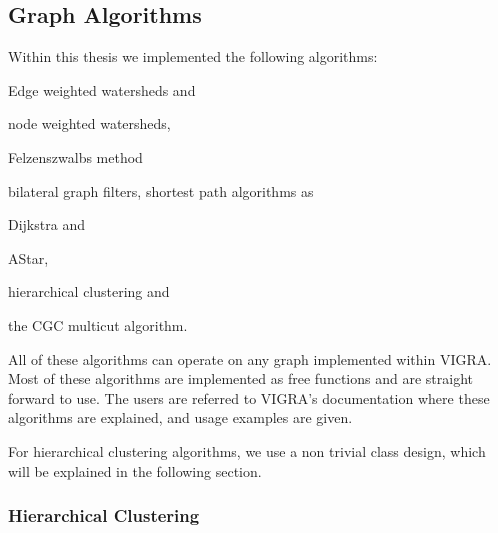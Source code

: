   





\subsection{Graph Algorithms} \label{sec:graph_graph_algorithms}
    
    Within this thesis we implemented the following algorithms:
    \begin{inparaenum}[(i)]
    \item Edge weighted watersheds and 
    \item node weighted watersheds,
    \item Felzenszwalbs method \cite{felzenszwalb_2004_ijcv}
    \item bilateral graph filters, shortest path algorithms
    as \item Dijkstra and \item AStar,
    \item hierarchical clustering and
    \item the CGC multicut algorithm.
    \end{inparaenum}


    All of these algorithms can operate on any graph implemented within VIGRA.
    Most of these algorithms are  implemented as free functions and are 
    straight forward to use.
    The users are referred to VIGRA's documentation where these
    algorithms are explained, and usage examples are given.

    For hierarchical clustering algorithms, we use a non trivial 
    class design, which will be explained in the following section.


    \subsubsection{Hierarchical Clustering}

